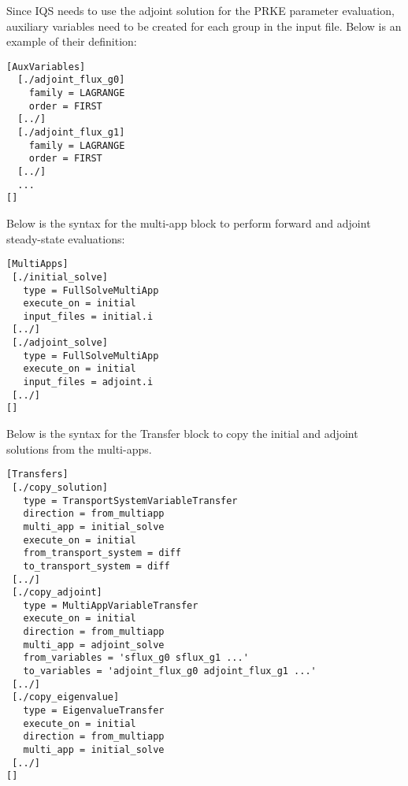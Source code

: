 Since IQS needs to use the adjoint solution for the PRKE parameter evaluation, auxiliary variables need to be created for each group in the input file.  Below is an example of their definition: 
\begin{lstlisting}
[AuxVariables]
  [./adjoint_flux_g0] 
    family = LAGRANGE
    order = FIRST
  [../]
  [./adjoint_flux_g1]
    family = LAGRANGE
    order = FIRST
  [../]
  ...
[]
\end{lstlisting}

Below is the syntax for the multi-app block to perform forward and adjoint steady-state evaluations:
\begin{lstlisting}
[MultiApps]
 [./initial_solve]
   type = FullSolveMultiApp
   execute_on = initial
   input_files = initial.i
 [../]
 [./adjoint_solve]
   type = FullSolveMultiApp
   execute_on = initial
   input_files = adjoint.i
 [../]
[]
\end{lstlisting}

Below is the syntax for the Transfer block to copy the initial and adjoint solutions from the multi-apps.
\begin{lstlisting}
[Transfers]
 [./copy_solution]
   type = TransportSystemVariableTransfer
   direction = from_multiapp
   multi_app = initial_solve
   execute_on = initial
   from_transport_system = diff
   to_transport_system = diff
 [../]
 [./copy_adjoint]
   type = MultiAppVariableTransfer
   execute_on = initial
   direction = from_multiapp
   multi_app = adjoint_solve
   from_variables = 'sflux_g0 sflux_g1 ...'
   to_variables = 'adjoint_flux_g0 adjoint_flux_g1 ...'
 [../]
 [./copy_eigenvalue]
   type = EigenvalueTransfer
   execute_on = initial
   direction = from_multiapp
   multi_app = initial_solve
 [../]
[]
\end{lstlisting}


